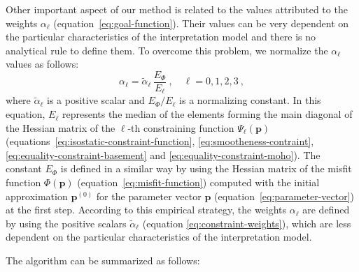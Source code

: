\documentclass[manuscript]{geophysics}
\begin{document}
Other important aspect of our method is related to the values attributed to 
the weights $\alpha_{\ell}$ (equation~\ref{eq:goal-function}).
Their values can be very dependent on the particular characteristics of the 
interpretation model and there is no analytical rule to define them. 
To overcome this problem, we normalize the $\alpha_{\ell}$ values as follows:
\begin{equation}
\alpha_{\ell} = \tilde{\alpha}_{\ell} \, \frac{E_{\Phi}}{E_{\ell}} \: 
, \quad \ell = 0, 1, 2, 3 \: ,
\label{eq:constraint-weights}
\end{equation}
where $\tilde{\alpha}_{\ell}$ is a positive scalar and $E_{\Phi} / E_{\ell}$
is a normalizing constant. In this equation, $E_{\ell}$ represents the median 
of the elements forming the main diagonal of the Hessian matrix of the 
$\ell$-th constraining function $\Psi_{\ell}(\mathbf{p})$ 
(equations~\ref{eq:isostatic-constraint-function}, 
\ref{eq:smootheness-contraint}, \ref{eq:equality-constraint-basement} and 
\ref{eq:equality-constraint-moho}). The constant $E_{\Phi}$ is defined in 
a similar way by using the Hessian matrix of the misfit function $\Phi(\mathbf{p})$ 
(equation~\ref{eq:misfit-function}) computed with 
the initial approximation $\mathbf{p}^{(0)}$ for the parameter vector $\mathbf{p}$ 
(equation~\ref{eq:parameter-vector}) at the first step.
According to this empirical strategy, the weights $\alpha_{\ell}$ are defined 
by using the positive scalars $\tilde{\alpha}_{\ell}$ 
(equation \ref{eq:constraint-weights}), which are less dependent on the particular 
characteristics of the interpretation model.

The algorithm can be summarized as follows:
\end{document}

